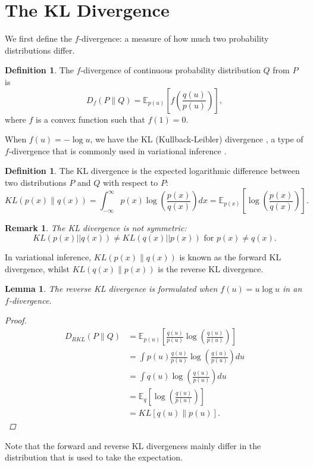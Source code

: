 \documentclass[honours,12pt]{unswthesis}
\newtheorem{lemma}[theorem]{Lemma}
\newtheorem{remark}[theorem]{Remark}
\numberwithin{equation}{section}
\theoremstyle{definition}
\newtheorem{definition}[theorem]{Definition}
\begin{document}
\section{The KL Divergence}
We first define the $f$-divergence: a measure of how much two probability distributions differ.
\begin{definition}
The $f$-divergence of continuous probability distribution $Q$ from $P$ is
\[D_f(P\|Q)=\mathbb{E}_{p(u)}\left[f\left(\frac{q(u)}{p(u)}\right)\right],\]
where $f$ is a convex function such that $f(1)=0$.
\end{definition}
When $f(u)=-\log u$, we have the KL (Kullback-Leibler) divergence \citep{KL}, a type of $f$-divergence that is commonly used in variational inference \citep{blei}.
\begin{definition}
The KL divergence is the expected logarithmic difference between two distributions $P$ and $Q$ with respect to $P$:
\begin{equation*}
KL(p(x)\|q(x))=\int_{-\infty}^\infty p(x)\log \left(\frac{p(x)}{q(x)}\right)dx=\mathbb{E}_{p(x)}\left[\log\left(\frac{p(x)}{q(x)}\right)\right].
\end{equation*}
\end{definition}
\begin{remark}
The KL divergence is not symmetric:
\begin{equation*}
KL(p(x)||q(x))\neq KL(q(x)||p(x))\text{ for }p(x)\neq q(x).
\end{equation*}
\end{remark}
In variational inference, $KL(p(x)\|q(x))$ is known as the forward KL divergence, whilst $KL(q(x)\|p(x))$ is the reverse KL divergence.
\begin{lemma}
The reverse KL divergence is formulated when $f(u)=u\log u$ in an $f$-divergence.
\begin{proof}
\begin{align*}
D_{RKL}(P\|Q)&=\mathbb{E}_{p(u)}\left[\frac{q(u)}{p(u)}\log \left(\frac{q(u)}{p(u)}\right)\right]\\
&=\int p(u)\frac{q(u)}{p(u)}\log\left(\frac{q(u)}{p(u)}\right)du\\
&= \int q(u)\log\left(\frac{q(u)}{p(u)}\right)du\\
&= \mathbb{E}_q\left[\log \left(\frac{q(u)}{p(u)}\right)\right]\\
&=KL[q(u)\|p(u)].
\end{align*}
\end{proof}
\end{lemma}
Note that the forward and reverse KL divergences mainly differ in the distribution that is used to take the expectation.
\end{document}
